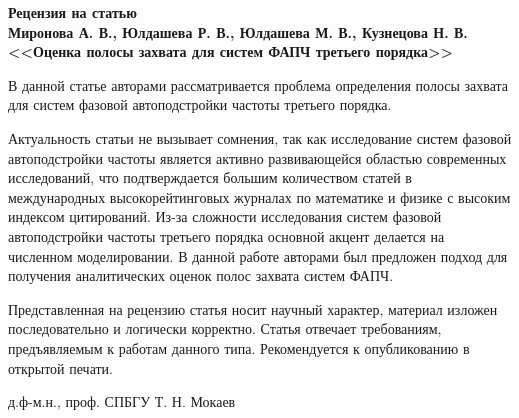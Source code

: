 \documentclass[a4paper,article,14pt]{extarticle}
\begin{document}
\begin{singlespace}
  {\small
    \begin{center}
      \begin{minipage}{0.8\textwidth}
        \begin{center}
          {\normalsize \textbf{Рецензия  на статью}}\\[0.2cm]
          \textbf{Миронова А. В., Юлдашева Р. В., Юлдашева М. В., Кузнецова Н. В. <<Оценка полосы захвата для систем ФАПЧ
третьего порядка>>}
        
        \end{center}
      \end{minipage}
    \end{center}

   В данной статье авторами рассматривается проблема определения полосы захвата для систем фазовой автоподстройки частоты третьего порядка.

   Актуальность статьи не вызывает сомнения, так как исследование систем фазовой автоподстройки частоты является активно развивающейся областью современных исследований, что подтверждается большим количеством статей в международных высокорейтинговых журналах по математике и физике с высоким индексом цитирований. Из-за сложности исследования систем фазовой автоподстройки частоты третьего порядка основной акцент делается на численном моделировании. В данной работе авторами был предложен подход для получения аналитических оценок полос захвата систем ФАПЧ.

    Представленная на рецензию статья носит научный характер, материал изложен последовательно и логически корректно. Статья отвечает требованиям, предъявляемым к работам данного типа. Рекомендуется к опубликованию в открытой печати.

    \vspace{0.2cm}
    \noindent
      \begin{flushright}
      д.ф-м.н., проф. СПБГУ Т. Н. Мокаев
      \end{flushright}
  }
\end{singlespace}
\end{document}
